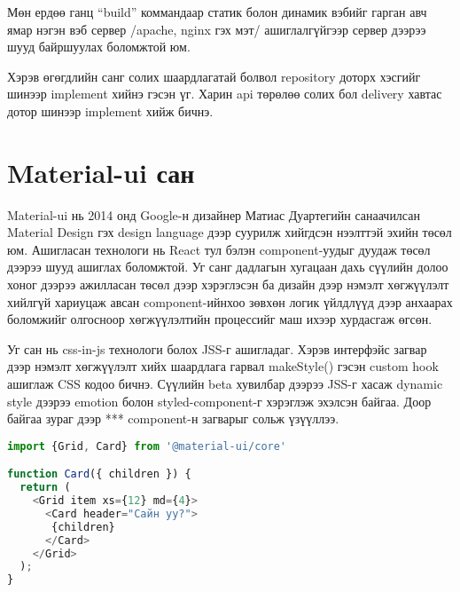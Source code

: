Мөн ердөө ганц “build” коммандаар статик болон динамик вэбийг гарган авч ямар нэгэн вэб сервер /apache, nginx гэх мэт/ ашиглалгүйгээр сервер дээрээ шууд байршуулах боломжтой юм.

\quad Хэрэв өгөгдлийн санг солих шаардлагатай болвол repository доторх хэсгийг шинээр implement хийнэ гэсэн үг. Харин api төрөлөө солих бол delivery хавтас дотор шинээр implement хийж бичнэ.

\section{Material-ui сан}
Material-ui нь 2014 онд Google-н дизайнер Матиас Дуартегийн санаачилсан Material Design гэх design language дээр суурилж хийгдсэн нээлттэй эхийн төсөл юм. Ашигласан технологи нь React тул бэлэн component-уудыг дуудаж төсөл дээрээ шууд ашиглах боломжтой. Уг санг дадлагын хугацаан дахь сүүлийн долоо хоног дээрээ ажилласан төсөл дээр хэрэглэсэн ба дизайн дээр нэмэлт хөгжүүлэлт хийлгүй хариуцаж авсан component-ийнхоо зөвхөн логик үйлдлүүд дээр анхаарах боломжийг олгосноор хөгжүүлэлтийн процессийг маш ихээр хурдасгаж өгсөн. 

Уг сан нь css-in-js технологи болох JSS-г ашигладаг. Хэрэв интерфэйс загвар дээр нэмэлт хөгжүүлэлт хийх шаардлага гарвал makeStyle() гэсэн custom hook ашиглаж CSS кодоо бичнэ. Сүүлийн beta хувилбар дээрээ JSS-г хасаж dynamic style дээрээ emotion болон styled-component-г хэрэглэж эхэлсэн байгаа. Доор байгаа зураг дээр *** component-н загварыг сольж үзүүллээ.

\begin{lstlisting}[language=Javascript, caption=Material-ui сангийн компонентыг ашиглаж буй байдал, frame=single]
import {Grid, Card} from '@material-ui/core'

function Card({ children }) {
  return (
    <Grid item xs={12} md={4}>
      <Card header="Сайн уу?">
       {children}
      </Card>
    </Grid>
  );
}
    
\end{lstlisting}
